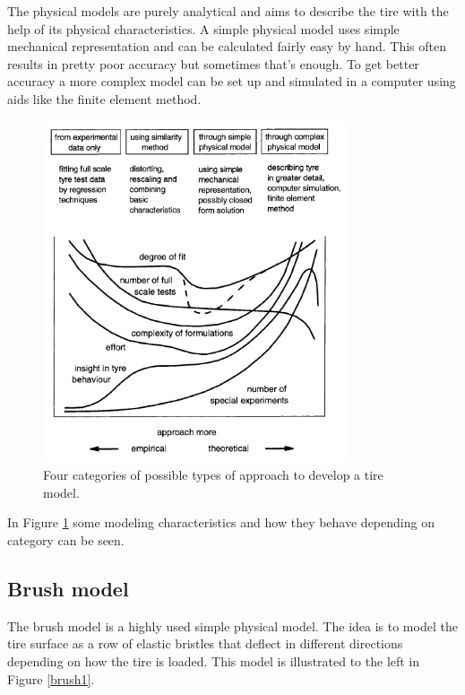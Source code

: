 The physical models are purely analytical and aims to describe the tire with the help of its physical characteristics. A simple physical model uses simple mechanical representation and can be calculated fairly easy by hand. This often results in pretty poor accuracy but sometimes that's enough. To get better accuracy a more complex model can be set up and simulated in a computer using aids like the finite element method. 

\begin{figure}[h]
	\centering
	\includegraphics[width=0.8\textwidth]{Pictures/tire_modeling}
	\caption{Four categories of possible types of approach to develop a tire model. \cite{pacejka}}
	\label{tire_modeling}
\end{figure}

In Figure \ref{tire_modeling} some modeling characteristics and how they behave depending on category can be seen.

\subsection{Brush model}
\label{sec:brush}
The brush model is a highly used simple physical model. The idea is to model the tire surface as a row of elastic bristles that deflect in different directions depending on how the tire is loaded. This model is illustrated to the left in Figure \ref{brush1}.

